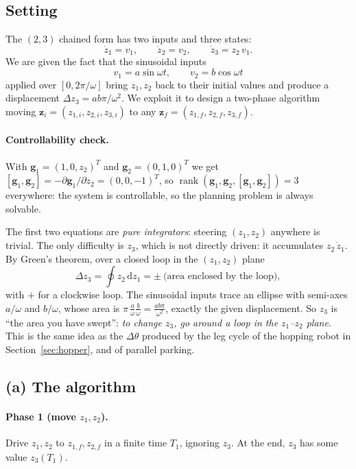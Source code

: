 \documentclass[11pt,a4paper]{article}
\theoremstyle{definition}
\theoremstyle{plain}
\theoremstyle{remark}
\newcommand{\g}{\boldsymbol{g}}
\newcommand{\z}{\boldsymbol{z}}
\newcommand{\rank}{\operatorname{rank}}
\begin{document}
\subsection{Setting}

The $(2,3)$ chained form has two inputs and three states:
\begin{equation}
  \dot z_1=v_1,\qquad \dot z_2=v_2,\qquad \dot z_3=z_2\,v_1 .
  \label{eq:chain}
\end{equation}
We are given the fact that the sinusoidal inputs
\[
  v_1=a\sin\omega t,\qquad v_2=b\cos\omega t
\]
applied over $[0,2\pi/\omega]$ bring $z_1,z_2$ back to their initial values and produce a displacement $\Delta z_3=ab\pi/\omega^2$. We exploit it to design a two-phase algorithm moving $\z_i=(z_{1,i},z_{2,i},z_{3,i})$ to any $\z_f=(z_{1,f},z_{2,f},z_{3,f})$.

\paragraph{Controllability check.} With $\g_1=(1,0,z_2)^T$ and $\g_2=(0,1,0)^T$ we get $[\g_1,\g_2]=-\partial\g_1/\partial z_2=(0,0,-1)^T$, so $\rank(\g_1,\g_2,[\g_1,\g_2])=3$ everywhere: the system is controllable, so the planning problem is always solvable.

\begin{intuition}
The first two equations are \emph{pure integrators}: steering $(z_1,z_2)$ anywhere is trivial. The only difficulty is $z_3$, which is not directly driven: it accumulates $z_2\,\dot z_1$. By Green's theorem, over a closed loop in the $(z_1,z_2)$ plane
\[
  \Delta z_3=\oint z_2\,\mathrm dz_1=\pm\ \text{(area enclosed by the loop)},
\]
with $+$ for a clockwise loop. The sinusoidal inputs trace an ellipse with semi-axes $a/\omega$ and $b/\omega$, whose area is $\pi\,\frac{a}{\omega}\frac{b}{\omega}=\frac{ab\pi}{\omega^2}$, exactly the given displacement. So $z_3$ is ``the area you have swept'': \emph{to change $z_3$, go around a loop in the $z_1$--$z_2$ plane}. This is the same idea as the $\Delta\theta$ produced by the leg cycle of the hopping robot in Section~\ref{sec:hopper}, and of parallel parking.
\end{intuition}

\subsection{(a) The algorithm}

\paragraph{Phase 1 (move $z_1,z_2$).} Drive $z_1,z_2$ to $z_{1,f},z_{2,f}$ in a finite time $T_1$, ignoring $z_3$. At the end, $z_3$ has some value $z_3(T_1)$.
\end{document}
